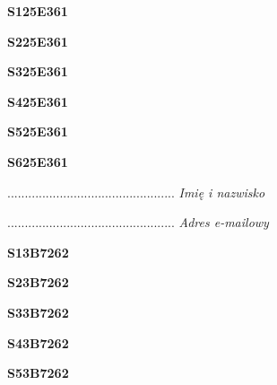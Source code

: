 \begin{turn}{90}\huge \textbf{S125E361}\end{turn}

\begin{turn}{90}\huge \textbf{S225E361}\end{turn}

\begin{turn}{90}\huge \textbf{S325E361}\end{turn}

\begin{turn}{90}\huge \textbf{S425E361}\end{turn}

\begin{turn}{90}\huge \textbf{S525E361}\end{turn}

\begin{turn}{90}\huge \textbf{S625E361}\end{turn}

\begin{turn}{90}\begin{minipage}{\linewidth} \vspace{20mm} ................................................  \textit{Imię i nazwisko}\end{minipage}\end{turn}

\begin{turn}{90}\begin{minipage}{\linewidth} \vspace{20mm} ................................................  \textit{Adres e-mailowy}\end{minipage}\end{turn}

\begin{turn}{90}\huge \textbf{S13B7262}\end{turn}

\begin{turn}{90}\huge \textbf{S23B7262}\end{turn}

\begin{turn}{90}\huge \textbf{S33B7262}\end{turn}

\begin{turn}{90}\huge \textbf{S43B7262}\end{turn}

\begin{turn}{90}\huge \textbf{S53B7262}\end{turn}

